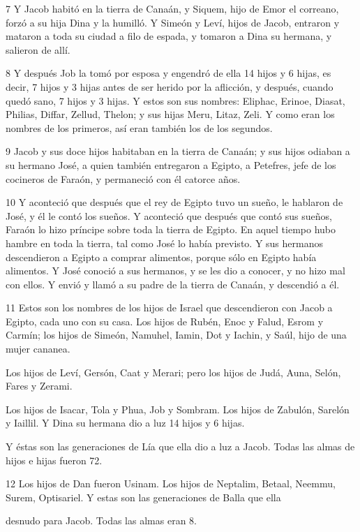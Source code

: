 \par 7 Y Jacob habitó en la tierra de Canaán, y Siquem, hijo de Emor el correano, forzó a su hija Dina y la humilló. Y Simeón y Leví, hijos de Jacob, entraron y mataron a toda su ciudad a filo de espada, y tomaron a Dina su hermana, y salieron de allí.

\par 8 Y después Job la tomó por esposa y engendró de ella 14 hijos y 6 hijas, es decir, 7 hijos y 3 hijas antes de ser herido por la aflicción, y después, cuando quedó sano, 7 hijos y 3 hijas. Y estos son sus nombres: Eliphac, Erinoe, Diasat, Philias, Diffar, Zellud, Thelon; y sus hijas Meru, Litaz, Zeli. Y como eran los nombres de los primeros, así eran también los de los segundos.

\par 9 Jacob y sus doce hijos habitaban en la tierra de Canaán; y sus hijos odiaban a su hermano José, a quien también entregaron a Egipto, a Petefres, jefe de los cocineros de Faraón, y permaneció con él catorce años.

\par 10 Y aconteció que después que el rey de Egipto tuvo un sueño, le hablaron de José, y él le contó los sueños. Y aconteció que después que contó sus sueños, Faraón lo hizo príncipe sobre toda la tierra de Egipto. En aquel tiempo hubo hambre en toda la tierra, tal como José lo había previsto. Y sus hermanos descendieron a Egipto a comprar alimentos, porque sólo en Egipto había alimentos. Y José conoció a sus hermanos, y se les dio a conocer, y no hizo mal con ellos. Y envió y llamó a su padre de la tierra de Canaán, y descendió a él.

\par 11 Estos son los nombres de los hijos de Israel que descendieron con Jacob a Egipto, cada uno con su casa. Los hijos de Rubén, Enoc y Falud, Esrom y Carmín; los hijos de Simeón, Namuhel, Iamin, Dot y Iachin, y Saúl, hijo de una mujer cananea.

Los hijos de Leví, Gersón, Caat y Merari; pero los hijos de Judá, Auna, Selón, Fares y Zerami.

\par Los hijos de Isacar, Tola y Phua, Job y Sombram. Los hijos de Zabulón, Sarelón y Iaillil. Y Dina su hermana dio a luz 14 hijos y 6 hijas.

Y éstas son las generaciones de Lía que ella dio a luz a Jacob. Todas las almas de hijos e hijas fueron 72.

\par 12 Los hijos de Dan fueron Usinam. Los hijos de Neptalim, Betaal, Neemmu, Surem, Optisariel. Y estas son las generaciones de Balla que ella
\par desnudo para Jacob. Todas las almas eran 8.

